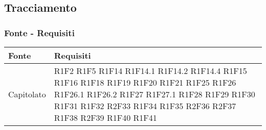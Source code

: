 \subsection{Tracciamento}
\subsubsection{Fonte - Requisiti}
\begin{center}
	\begin{longtable}{|p{44mm}|p{22mm}|}
		\hline
		\rowcolor{lighter-grayer}
		\textbf{Fonte} &  \textbf{Requisiti}  \\
		\hline
		\endhead
		
		
Capitolato &
R1F2 \newline
R1F5 \newline
R1F14 \newline
R1F14.1 \newline
R1F14.2 \newline
R1F14.4 \newline
R1F15 \newline
R1F16 \newline
R1F18 \newline
R1F19 \newline
R1F20 \newline
R1F21 \newline
R1F25 \newline
R1F26 \newline
R1F26.1 \newline
R1F26.2 \newline
R1F27 \newline
R1F27.1 \newline
R1F28 \newline
R1F29 \newline
R1F30 \newline
R1F31 \newline
R1F32 \newline
R2F33 \newline
R1F34 \newline
R1F35 \newline
R2F36 \newline
R2F37 \newline
R1F38 \newline
R2F39 \newline
R1F40 \newline
R1F41 \newline

\end{longtable}
\end{center}
